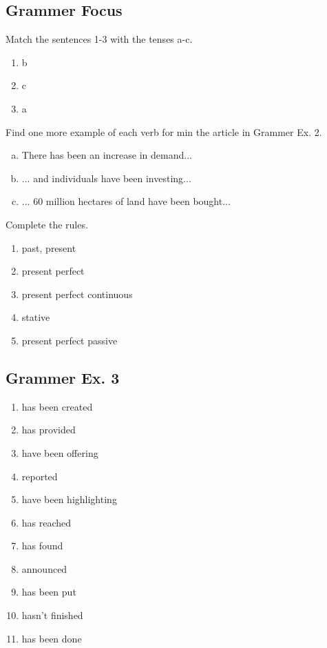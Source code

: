 \documentclass[12pt, a4paper, oneside]{article}
\begin{document}
  \subsection{Grammer Focus}
  Match the sentences 1-3 with the tenses a-c.
  \begin{enumerate}[1.] 
    \item b
    \item c
    \item a
  \end{enumerate}

  Find one more example of each verb for min the article in Grammer Ex. 2.
  \begin{enumerate}[a.)]
    \item There has been an increase in demand...
    \item ... and individuals have been investing...
    \item ... 60 million hectares of land have been bought...
  \end{enumerate}

  Complete the rules.
  \begin{enumerate}[1.]
    \item past, present
    \item present perfect
    \item present perfect continuous
    \item stative
    \item present perfect passive
  \end{enumerate}

  \subsection{Grammer Ex. 3}
  \begin{enumerate}[1.]
    \item has been created
    \item has provided
    \item have been offering
    \item reported
    \item have been highlighting
    \item has reached
    \item has found
    \item announced
    \item has been put
    \item hasn't finished
    \item has been done
  \end{enumerate}
\end{document}
